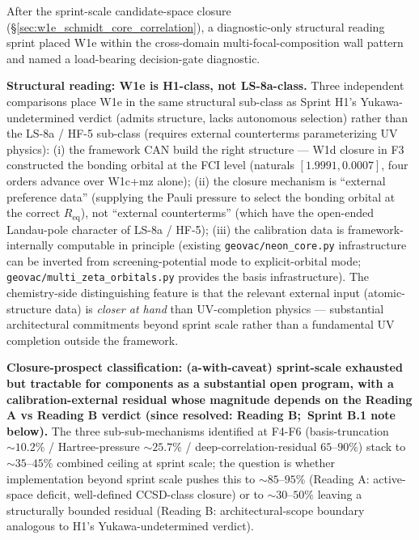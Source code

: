 \documentclass[aps,pra,twocolumn,superscriptaddress,longbibliography]{revtex4-2}
\begin{document}
After the sprint-scale candidate-space closure
(\S\ref{sec:w1e_schmidt_core_correlation}), a diagnostic-only
structural reading sprint placed W1e within the cross-domain
multi-focal-composition wall pattern and named a load-bearing
decision-gate diagnostic.

\textbf{Structural reading: W1e is H1-class, not LS-8a-class.}
Three independent comparisons place W1e in the same structural
sub-class as Sprint H1's Yukawa-undetermined verdict (admits
structure, lacks autonomous selection) rather than the LS-8a /
HF-5 sub-class (requires external counterterms parameterizing UV
physics): (i) the framework CAN build the right structure --- W1d
closure in F3 constructed the bonding orbital at the FCI level
(naturals $[1.9991, 0.0007]$, four orders advance over W1c+mz
alone); (ii) the closure mechanism is ``external preference data''
(supplying the Pauli pressure to select the bonding orbital at the
correct $R_\text{eq}$), not ``external counterterms'' (which have
the open-ended Landau-pole character of LS-8a / HF-5); (iii) the
calibration data is framework-internally computable in principle
(existing \texttt{geovac/neon\_core.py} infrastructure can be
inverted from screening-potential mode to explicit-orbital mode;
\texttt{geovac/multi\_zeta\_orbitals.py} provides the basis
infrastructure). The chemistry-side distinguishing feature is that
the relevant external input (atomic-structure data) is
\emph{closer at hand} than UV-completion physics --- substantial
architectural commitments beyond sprint scale rather than a fundamental
UV completion outside the framework.

\textbf{Closure-prospect classification: (a-with-caveat)
sprint-scale exhausted but tractable for components as a
substantial open program, with a calibration-external residual
whose magnitude depends on the Reading A vs Reading B verdict (since
resolved: Reading B;\ Sprint B.1 note below).} The three sub-sub-mechanisms
identified at F4-F6 (basis-truncation $\sim 10.2\%$ / Hartree-pressure
$\sim 25.7\%$ / deep-correlation-residual $65$--$90\%$) stack to
$\sim 35$--$45\%$ combined ceiling at sprint scale; the question is
whether implementation beyond sprint scale pushes this to $\sim 85$--$95\%$
(Reading A: active-space deficit, well-defined CCSD-class closure)
or to $\sim 30$--$50\%$ leaving a structurally bounded residual
(Reading B: architectural-scope boundary analogous to H1's
Yukawa-undetermined verdict).
\end{document}
